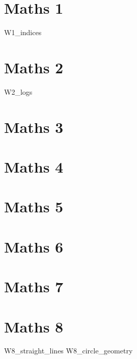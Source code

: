 \documentclass[12pt]{exam}
\begin{document}
\tableofcontents
\newpage

\section{Maths 1}
{W1_indices}

\newpage
\section{Maths 2}
{W2_logs}

\newpage
\section{Maths 3}
\section{Maths 4}
\section{Maths 5}
\section{Maths 6}
\section{Maths 7}

\newpage
\section{Maths 8}
{W8_straight_lines}
\newpage
{W8_circle_geometry}
\end{document}

